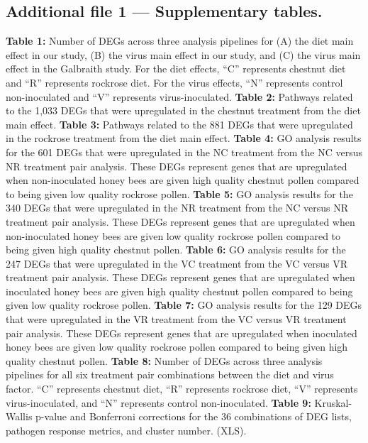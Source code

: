 \documentclass{bmcart}
\begin{document}
\begin{linenumbers}
\begin{backmatter}
  \subsection*{Additional file 1 --- Supplementary tables.}
    \textbf{Table 1:} Number of DEGs across three analysis pipelines for (A) the diet main effect in our study, (B) the virus main effect in our study, and (C) the virus main effect in the Galbraith study. For the diet effects, ``C'' represents chestnut diet and ``R'' represents rockrose diet. For the virus effects, ``N'' represents control non-inoculated and ``V'' represents virus-inoculated.
    \textbf{Table 2:} Pathways related to the 1,033 DEGs that were upregulated in the chestnut treatment from the diet main effect.
    \textbf{Table 3:} Pathways related to the 881 DEGs that were upregulated in the rockrose treatment from the diet main effect.
    \textbf{Table 4:} GO analysis results for the 601 DEGs that were upregulated in the NC treatment from the NC versus NR treatment pair analysis. These DEGs represent genes that are upregulated when non-inoculated honey bees are given high quality chestnut pollen compared to being given low quality rockrose pollen.
    \textbf{Table 5:} GO analysis results for the 340 DEGs that were upregulated in the NR treatment from the NC versus NR treatment pair analysis. These DEGs represent genes that are upregulated when non-inoculated honey bees are given low quality rockrose pollen compared to being given high quality chestnut pollen.
    \textbf{Table 6:} GO analysis results for the 247 DEGs that were upregulated in the VC treatment from the VC versus VR treatment pair analysis. These DEGs represent genes that are upregulated when inoculated honey bees are given high quality chestnut pollen compared to being given low quality rockrose pollen.
    \textbf{Table 7:} GO analysis results for the 129 DEGs that were upregulated in the VR treatment from the VC versus VR treatment pair analysis. These DEGs represent genes that are upregulated when inoculated honey bees are given low quality rockrose pollen compared to being given high quality chestnut pollen.
    \textbf{Table 8:} Number of DEGs across three analysis pipelines for all six treatment pair combinations between the diet and virus factor. ``C'' represents chestnut diet, ``R'' represents rockrose diet, ``V'' represents virus-inoculated, and ``N'' represents control non-inoculated.
    \textbf{Table 9:} Kruskal-Wallis p-value and Bonferroni corrections for the 36 combinations of DEG lists, pathogen response metrics, and cluster number. (XLS).


\end{backmatter}
\end{linenumbers}
\end{document}
